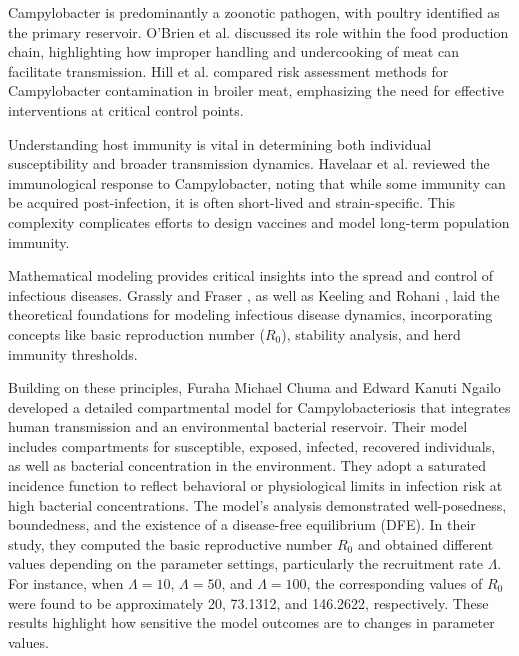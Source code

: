 \documentclass[a4paper,12pt]{report}
\begin{document}
Campylobacter is predominantly a zoonotic pathogen, with poultry identified as the primary reservoir. O’Brien et al. \cite{HUM} discussed its role within the food production chain, highlighting how improper handling and undercooking of meat can facilitate transmission. Hill et al. \cite{NAUTA} compared risk assessment methods for Campylobacter contamination in broiler meat, emphasizing the need for effective interventions at critical control points.






Understanding host immunity is vital in determining both individual susceptibility and broader transmission dynamics. Havelaar et al. \cite{HAVELL} reviewed the immunological response to Campylobacter, noting that while some immunity can be acquired post-infection, it is often short-lived and strain-specific. This complexity complicates efforts to design vaccines and model long-term population immunity.






Mathematical modeling provides critical insights into the spread and control of infectious diseases. Grassly and Fraser \cite{GRSS}, as well as Keeling and Rohani \cite{K&R}, laid the theoretical foundations for modeling infectious disease dynamics, incorporating concepts like basic reproduction number ($R_0$), stability analysis, and herd immunity thresholds.

Building on these principles, Furaha Michael Chuma and Edward Kanuti Ngailo \cite{FRAHA} developed a detailed compartmental model for Campylobacteriosis that integrates human transmission and an environmental bacterial reservoir. Their model includes compartments for susceptible, exposed, infected, recovered individuals, as well as bacterial concentration in the environment. They adopt a saturated incidence function to reflect behavioral or physiological limits in infection risk at high bacterial concentrations. The model’s analysis demonstrated well-posedness, boundedness, and the existence of a disease-free equilibrium (DFE). In their study, they computed the basic reproductive number \( R_0 \) and obtained different values depending on the parameter settings, particularly the recruitment rate \( \Lambda \). For instance, when \( \Lambda = 10 \), \( \Lambda = 50 \), and \( \Lambda = 100 \), the corresponding values of \( R_0 \) were found to be approximately 20, 73.1312, and 146.2622, respectively. These results highlight how sensitive the model outcomes are to changes in parameter values. 
\end{document}
